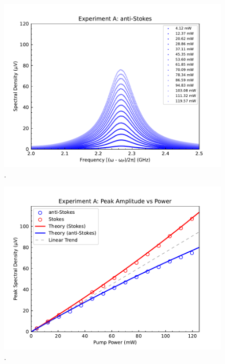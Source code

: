 
\begin{figure}[t]
  \centering
  \includegraphics[width=\textwidth]{figs/3-Cooling/P-O anti-Stokes.pdf}
  \caption{.}
  \label{fig:Cooling:P-O anti-Stokes}
\end{figure}


\begin{figure}[t]
  \centering
  \includegraphics[width=\textwidth]{figs/3-Cooling/P-O Heights vs Pow.pdf}
  \caption{.}
  \label{fig:Cooling:P-O Heights vs Pow}
\end{figure}

